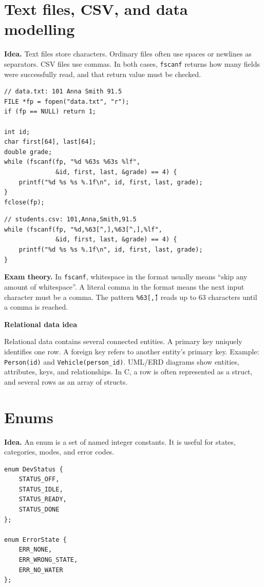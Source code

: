 \documentclass[10pt,a4paper]{article}
\newcommand{\idea}{\noindent\textbf{\textcolor{accentdark}{Idea.}} }
\newcommand{\theory}{\noindent\textbf{\textcolor{accentdark}{Exam theory.}} }
\newcommand{\minihead}[1]{\par\smallskip\noindent\colorbox{softblue}{\parbox{\dimexpr\linewidth-2\fboxsep}{\textbf{#1}}}\par\smallskip}
\begin{document}
\section{Text files, CSV, and data modelling}
\idea Text files store characters. Ordinary files often use spaces or newlines as separators. CSV files use commas. In both cases, \texttt{fscanf} returns how many fields were successfully read, and that return value must be checked.

\begin{lstlisting}[caption={Ordinary whitespace-separated file reading}]
// data.txt: 101 Anna Smith 91.5
FILE *fp = fopen("data.txt", "r");
if (fp == NULL) return 1;

int id;
char first[64], last[64];
double grade;
while (fscanf(fp, "%d %63s %63s %lf",
              &id, first, last, &grade) == 4) {
    printf("%d %s %s %.1f\n", id, first, last, grade);
}
fclose(fp);
\end{lstlisting}

\begin{lstlisting}[caption={Simple CSV with fscanf}]
// students.csv: 101,Anna,Smith,91.5
while (fscanf(fp, "%d,%63[^,],%63[^,],%lf",
              &id, first, last, &grade) == 4) {
    printf("%d %s %s %.1f\n", id, first, last, grade);
}
\end{lstlisting}

\theory In \texttt{fscanf}, whitespace in the format usually means ``skip any amount of whitespace''. A literal comma in the format means the next input character must be a comma. The pattern \texttt{\%63[\^,]} reads up to 63 characters until a comma is reached.

\minihead{Relational data idea}
Relational data contains several connected entities. A primary key uniquely identifies one row. A foreign key refers to another entity's primary key. Example: \texttt{Person(id)} and \texttt{Vehicle(person\_id)}. UML/ERD diagrams show entities, attributes, keys, and relationships. In C, a row is often represented as a struct, and several rows as an array of structs.

\section{Enums}
\idea An enum is a set of named integer constants. It is useful for states, categories, modes, and error codes.

\begin{lstlisting}[caption={State and error enums}]
enum DevStatus {
    STATUS_OFF,
    STATUS_IDLE,
    STATUS_READY,
    STATUS_DONE
};

enum ErrorState {
    ERR_NONE,
    ERR_WRONG_STATE,
    ERR_NO_WATER
};
\end{lstlisting}
\end{document}
